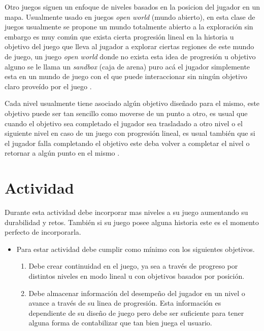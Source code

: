 Otro juegos siguen un enfoque de niveles basados en la posicion del jugador en un mapa. Usualmente usado en juegos \emph{open world} (mundo abierto), en esta clase de juegos usualmente se propone un mundo totalmente abierto a la exploración sin embargo es muy común que exista cierta progresión lineal en la historia u objetivo del juego que lleva al jugador a explorar ciertas regiones de este mundo de juego, un juego \emph{open world} donde no exista esta idea de progresión u objetivo alguno se le llama un \textit{sandbox} (caja de arena) puro acá el jugador simplemente esta en un mundo de juego con el que puede interaccionar sin ningún objetivo claro proveído por el juego \cite[p.~104]{jenkinscreatinggames}.

Cada nivel usualmente tiene asociado algún objetivo diseñado para el mismo, este objetivo puede ser tan sencillo como moverse de un punto a otro, es usual que cuando el objetivo sea completado el jugador sea trasladado a otro nivel o el siguiente nivel en caso de un juego con progresión lineal, es usual también que si el jugador falla completando el objetivo este deba volver a completar el nivel o retornar a algún punto en el mismo \cite[p.~111]{bobbatesgamedesign}.
\section{Actividad}
Durante esta actividad debe incorporar mas niveles a su juego aumentando su durabilidad y retos. También si su juego posee alguna historia este es el momento perfecto de incorporarla.
\begin{itemize}
\item Para estar actividad debe cumplir como mínimo con los siguientes objetivos.
\begin{enumerate}
  \item Debe crear continuidad en el juego, ya sea a través de progreso por distintos niveles en modo lineal u con objetivos basados por posición.
  \item Debe almacenar información del desempeño del jugador en un nivel o avance a través de su linea de progresión. Esta información es dependiente de su diseño de juego pero debe ser suficiente para tener alguna forma de contabilizar que tan bien juega el usuario.
\end{enumerate}
\end{itemize}